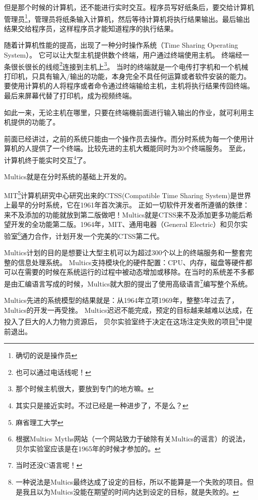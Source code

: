 \begin{insertnote}
但是那个时候的计算机，还不能进行实时交互。程序员写好纸条后，要交给计算机管理员\footnote{确切的说是操作员}，管理员将纸条输入计算机，然后等待计算机将执行结果输出。最后输出结果交给程序员，这样程序员才能知道程序的执行结果。


随着计算机性能的提高，出现了一种分时操作系统（Time Sharing Operating System）。 
它可以让大型主机提供数个终端，用户通过终端使用主机。
终端经一条很长很长的线缆\footnote{也可以通过电话线呢！}连接到主机上\footnote{那个时候主机很大，要放到专门的地方嘛。}。
当时的终端就是一个电传打字机和一个机械打印机，只具有输入/输出的功能，本身完全不具任何运算或者软件安装的能力。要使用计算机的人将程序或者命令通过终端输给主机，主机将执行结果传回终端。最后来屏幕代替了打印机，成为视频终端。


如此一来，无论主机在哪里，只要在终端機前面进行输入输出的作业，就可利用主机提供的功能了。

前面已经讲过，之前的系统只能由一个操作员去操作。而分时系统为每一个使用计算机的人提供了一个终端。比较先进的主机大概能同时为30个终端服务。 至此，计算机终于能实时交互\footnote{其实只是接近实时。不过已经是一种进步了，不是么？}了。

Multics就是在分时系统的基础上开发的。

\end{insertnote}

MIT\footnote{麻省理工大学}计算机研究中心研究出来的CTSS(Compatible Time Sharing System)是世界上最早的分时系统，它在1961年首次演示。
正如一切软件开发者所遵循的鉄律：来不及添加的功能就放到第二版做吧！Multics就是CTSS来不及添加更多功能后希望开发的全功能第二版。1964年，MIT、通用电器（General Electric）和贝尔实验室\footnote{根据Multics Myths网站（一个网站致力于破除有关Multics的谣言）的说法，贝尔实验室应该是在1965年的时候才参加的。
}通力合作，计划开发一个完美的CTSS第二代。

Multics计划的目的是想要让大型主机可以\textbf{}为超过300个以上的终端服务和一整套完整的信息处理系统。
Multics支持模块化的硬件配置：CPU、内存，磁盘等硬件都可以在需要的时候在系统运行的过程中被动态增加或移除。在当时的系统差不多都是由汇编语言写成的时候，Multics就大胆的提出了使用高级语言\footnote{当时还没C语言呢！}编写整个系统。

Multics先进的系统模型的结果就是：从1964年立项1969年，整整5年过去了，Multics的开发一再受挫。
Multics迟迟不能完成，预定的目标越来越难以达成，在投入了巨大的人力物力资源后，
贝尔实验室终于决定在这场注定失败的项目\footnote{一种说法是Multics最终达成了设定的目标，所以不能算是一个失败的项目。但是我且以为Multics没能在期望的时间内达到设定的目标，就是失败的。}中提前退出。

